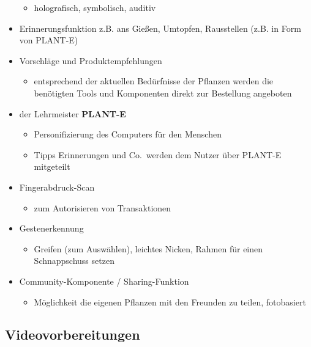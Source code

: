 \begin{itemize}
  \begin{itemize}
  \tightlist
  \item
    holografisch, symbolisch, auditiv
  \end{itemize}
\item
  Erinnerungsfunktion z.B. ans Gießen, Umtopfen, Rausstellen (z.B. in
  Form von PLANT-E)
\item
  Vorschläge und Produktempfehlungen

  \begin{itemize}
  \tightlist
  \item
    entsprechend der aktuellen Bedürfnisse der Pflanzen werden die
    benötigten Tools und Komponenten direkt zur Bestellung angeboten
  \end{itemize}
\item
  der Lehrmeister \textbf{PLANT-E}

  \begin{itemize}
  \tightlist
  \item
    Personifizierung des Computers für den Menschen
  \item
    Tipps Erinnerungen und Co.~werden dem Nutzer über PLANT-E mitgeteilt
  \end{itemize}
\item
  Fingerabdruck-Scan

  \begin{itemize}
  \tightlist
  \item
    zum Autorisieren von Transaktionen
  \end{itemize}
\item
  Gestenerkennung

  \begin{itemize}
  \tightlist
  \item
    Greifen (zum Auswählen), leichtes Nicken, Rahmen für einen
    Schnappschuss setzen
  \end{itemize}
\item
  Community-Komponente / Sharing-Funktion

  \begin{itemize}
  \tightlist
  \item
    Möglichkeit die eigenen Pflanzen mit den Freunden zu teilen,
    fotobasiert
  \end{itemize}
\end{itemize}

\hypertarget{videovorbereitungen}{%
\subsection{Videovorbereitungen}\label{videovorbereitungen}}

